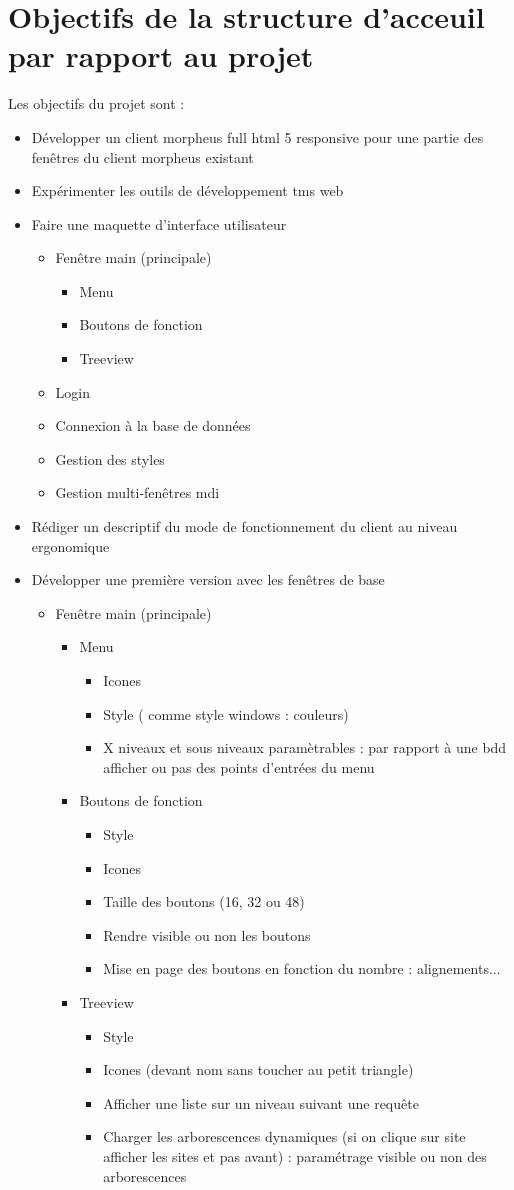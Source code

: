 \documentclass[a4paper, 12pt, french]{article}
\newcommand{\bdot}{\item[\color{ssiYellow}\ding{108}]}
\newcommand{\bdotoutlined}{\item[\color{ssiYellow}\ding{109}]}
\newcommand{\bsquare}{\item[\color{ssiYellow}\ding{110}]}
\begin{document}
	\newpage

	\section{Objectifs de la structure d'acceuil par rapport au projet}
		\noindent Les objectifs du projet sont :
		\begin{itemize}
			\bdot{Développer un client morpheus full html 5 responsive pour une partie des fenêtres du client morpheus existant}
			\bdot{Expérimenter les outils de développement tms web}
			\bdot{Faire une maquette d'interface utilisateur}
				\begin{itemize}
					\bdotoutlined{Fenêtre main (principale)}
						\begin{itemize}
							\bsquare{Menu}
							\bsquare{Boutons de fonction}
							\bsquare{Treeview}
						\end{itemize}
					\bdotoutlined{Login}
					\bdotoutlined{Connexion à la base de données}
					\bdotoutlined{Gestion des styles}
					\bdotoutlined{Gestion multi-fenêtres mdi}
				\end{itemize}
			\bdot{Rédiger un descriptif du mode de fonctionnement du client au niveau ergonomique}
			\bdot{Développer une première version avec les fenêtres de base}
				\begin{itemize}
					\bdotoutlined{Fenêtre main (principale)}
						\begin{itemize}
							\bsquare{Menu}
								\begin{itemize}
									\bdot{Icones}
									\bdot{Style ( comme style windows : couleurs)}
									\bdot{X niveaux et sous niveaux paramètrables : par rapport à une bdd afficher ou pas des points d'entrées du menu}
								\end{itemize}
							\bsquare{Boutons de fonction}
								\begin{itemize}
									\bdot{Style}
									\bdot{Icones}
									\bdot{Taille des boutons (16, 32 ou 48)}
									\bdot{Rendre visible ou non les boutons}
									\bdot{Mise en page des boutons en fonction du nombre : alignements...}									
								\end{itemize}
							\bsquare{Treeview}
								\begin{itemize}
									\bdot{Style}
									\bdot{Icones (devant nom sans toucher au petit triangle)}
									\bdot{Afficher une liste sur un niveau suivant une requête}
									\bdot{Charger les arborescences dynamiques (si on clique sur site afficher les sites et pas avant) : paramétrage visible ou non des arborescences}
								\end{itemize}
						\end{itemize}
					

\end{itemize}
\end{itemize}
\end{document}
